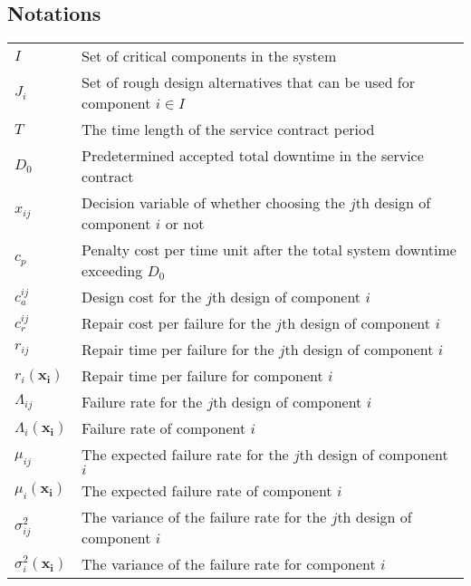 \documentclass[preprint,12pt]{elsarticle}
\begin{document}
 \subsection{Notations}
   \begin{tabular}{l l}
$I$ & Set of critical components in the system\\
$J_{i}$ & Set of rough design alternatives that can be used for component $i \in I$\\
$T$ & The time length of the service contract period\\
$D_0$ & Predetermined accepted total downtime in the service contract\\
$x_{ij}$ & Decision variable of whether choosing the $j$th design of component $i$ or not\\
$c_p$ & Penalty cost per time unit after the total system downtime exceeding $D_0$\\
$c^{ij}_{a}$ & Design cost for the $j$th design of component $i$\\
$c_r^{ij}$ & Repair cost per failure for the $j$th design of component $i$\\
$r_{ij}$ & Repair time per failure for the $j$th design of component $i$\\
$r_{i}(\boldsymbol{x_{i}})$ & Repair time per failure for component $i$\\
$\Lambda_{ij}$ & Failure rate for the $j$th design of component $i$\\
$\Lambda_{i}(\boldsymbol{x_{i}})$  & Failure rate of component $i$\\
$\mu_{ij}$ & The expected failure rate for the $j$th design of component $i$ \\
$\mu_{i}(\boldsymbol{x_{i}})$ & The expected failure rate of component $i$ \\
$\sigma_{ij}^{2}$ & The variance of the failure rate for the $j$th design of component $i$\\
$\sigma_{i}^{2}(\boldsymbol{x_{i}})$ &  The variance of the failure rate for component $i$ \\

\end{tabular}
\end{document}

